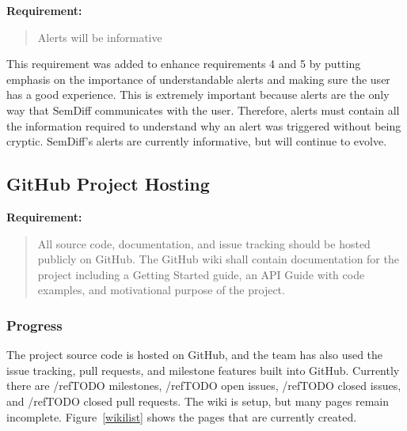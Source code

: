 \documentclass[draftclsnofoot,onecolumn]{IEEEtran}
\begin{document}
\textbf{Requirement:}

\begin{quote}

Alerts will be informative

\end{quote}

This requirement was added to enhance requirements 4 and 5 by putting 
emphasis on the importance of understandable alerts and making sure the user 
has a good experience. This is extremely important because alerts are the 
only way that SemDiff communicates with the user. Therefore, alerts must 
contain all the information required to understand why an alert was 
triggered without being cryptic. SemDiff’s alerts are currently informative, 
but will continue to evolve.







\subsection{GitHub Project Hosting}

\textbf{Requirement:}

\begin{quote}

All source code, documentation, and issue tracking should be hosted publicly 
on GitHub. The GitHub wiki shall contain documentation for the project 
including a Getting Started guide, an API Guide with code examples, and 
motivational purpose of the project.

\end{quote}

\subsubsection{Progress}

The project source code is hosted on GitHub, and the team has also used the 
issue tracking, pull requests, and milestone features built into GitHub. 
Currently there are /ref{TODO} milestones, /ref{TODO} open issues, 
/ref{TODO} closed issues, and /ref{TODO} closed pull requests. The wiki is 
setup, but many pages remain incomplete. Figure~\ref{wikilist} shows the 
pages that are currently created.
\end{document}
